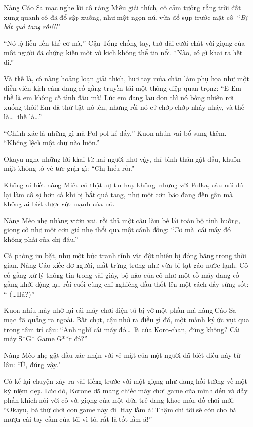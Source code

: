 \documentclass[../main.tex]{subfiles}
\begin{document}
Nàng Cáo Sa mạc nghe lời cô nàng Miêu giải thích, cô cảm tưởng rằng trời đất xung quanh cô đã đổ sập xuống, như một ngọn núi vừa đổ sụp trước mặt cô. ``\textit{Bị bắt quả tang rồi!!!}''

``Nó lộ liễu đến thế cơ mà,'' Cậu Tổng chống tay, thở dài cười chát với giọng của một người đã chứng kiến một vở kịch không thể tin nổi. ``Nào, có gì khai ra hết đi.''

Và thế là, cô nàng hoảng loạn giải thích, huơ tay múa chân làm phụ họa như một diễn viên kịch câm đang cố gắng truyền tải một thông điệp quan trọng: ``E-Em thề là em không cố tình đâu mà! Lúc em đang lau dọn thì nó bỗng nhiên rơi xuống thôi! Em đã thử bật nó lên, nhưng rồi nó cứ chớp chớp nháy nháy, và thế là\dots\ thế là\dots''


``Chính xác là những gì mà Pol-pol kể đấy,'' Kuon nhún vai bổ sung thêm. ``Không lệch một chữ nào luôn.''

Okayu nghe những lời khai từ hai người như vậy, chỉ bình thản gật đầu, khuôn mặt không tỏ vẻ tức giận gì: ``Chị hiểu rồi.''

Không ai biết nàng Miêu có thật sự tin hay không, nhưng với Polka, câu nói đó lại làm cô sợ hơn cả khi bị bắt quả tang, như một cơn bão đang đến gần mà không ai biết được sức mạnh của nó.

Nàng Mèo nhẹ nhàng vươn vai, rồi thả một câu làm bẻ lái toàn bộ tình huống, giọng cô như một cơn gió nhẹ thổi qua một cánh đồng: ``Cơ mà, cái máy đó không phải của chị đâu.''

Cả phòng im bặt, như một bức tranh tĩnh vật đột nhiên bị đóng băng trong thời gian. Nàng Cáo xiếc đơ người, mắt trừng trừng như vừa bị tạt gáo nước lạnh. Cô cố gắng xử lý thông tin trong vài giây, bộ não của cô như một cỗ máy đang cố gắng khởi động lại, rồi cuối cùng chỉ nghiêng đầu thốt lên một cách đầy sửng sốt: `` (\dots Hả?)''

Kuon nhíu mày nhớ lại cái máy chơi điện tử bị vỡ một phần mà nàng Cáo Sa mạc đã quẳng ra ngoài. Bất chợt, cậu nhớ ra điều gì đó, một mảnh ký ức vụt qua trong tâm trí cậu: ``Anh nghĩ cái máy đó\dots\ là của Koro-chan, đúng không? Cái máy S*G* Game G**r đó?''

Nàng Mèo nhẹ gật đầu xác nhận với vẻ mặt của một người đã biết điều này từ lâu: ``Ừ, đúng vậy.''

Cô kể lại chuyện xảy ra vài tiếng trước với một giọng như đang hồi tưởng về một kỷ niệm đẹp. Lúc đó, Korone đã mang chiếc máy chơi game của mình đến và đầy phấn khích nói với cô với giọng của một đứa trẻ đang khoe món đồ chơi mới: ``Okayu, bà thử chơi con game này đi! Hay lắm á! Thậm chí tôi sẽ còn cho bà mượn cái tay cầm của tôi vì tôi rất là tốt lắm á!''
\end{document}
